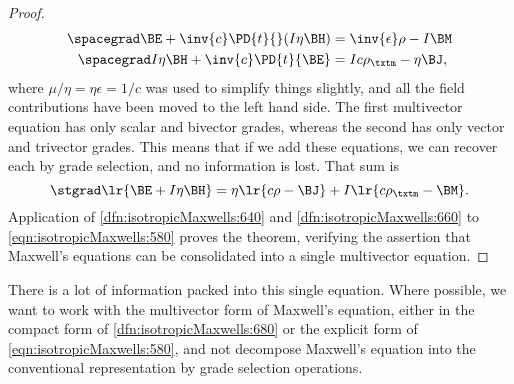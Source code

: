 \begin{proof}
\begin{equation}\label{eqn:isotropicMaxwells:560}
\begin{aligned}
\spacegrad \BE        + \inv{c} \PD{t}{} (I \eta \BH) &= \inv{\epsilon}\rho - I \BM  \\
\spacegrad I \eta \BH + \inv{c} \PD{t}{\BE}           &= I c \rho_\txtm - \eta \BJ,
\end{aligned}
\end{equation}
where \( \mu/\eta = \eta \epsilon = 1/c \) was used to simplify things slightly, and all the field contributions have been moved to the left hand side.
The first multivector equation has only scalar and bivector grades, whereas the second has only vector and trivector grades.  This means that if we add these equations, we can recover each by grade selection, and no information is lost.  That sum is
\begin{equation}\label{eqn:isotropicMaxwells:580}
\stgrad \lr{ \BE + I \eta \BH } = \eta\lr{ c \rho - \BJ } + I \lr{ c \rho_\txtm - \BM }.
\end{equation}
Application of \cref{dfn:isotropicMaxwells:640} and \cref{dfn:isotropicMaxwells:660} to
\cref{eqn:isotropicMaxwells:580} proves the theorem, verifying the
assertion that Maxwell's equations can be consolidated into a single multivector equation.
\end{proof}
There is a lot of information packed into this single equation.
Where possible, we want to work with the multivector form of Maxwell's equation, either in the
compact form of \cref{dfn:isotropicMaxwells:680} or the explicit form of \cref{eqn:isotropicMaxwells:580},
and not decompose Maxwell's equation into the conventional representation by grade selection operations.

